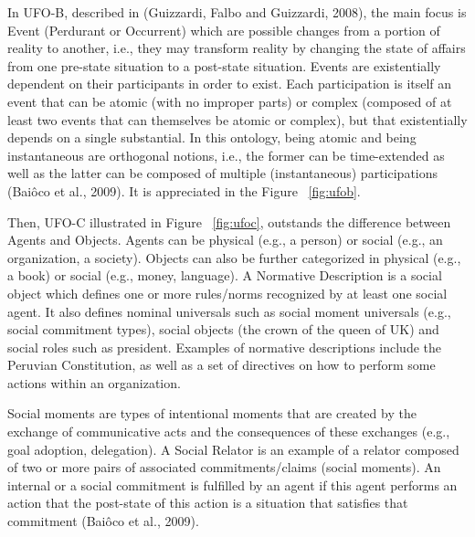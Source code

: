 In UFO-B, described in (Guizzardi, Falbo and Guizzardi, 2008), the main focus is Event (Perdurant or Occurrent) which are possible changes from a portion of reality to another, i.e., they may transform reality by changing the state of affairs from one pre-state situation to a post-state situation. Events are existentially dependent on their participants in order to exist. Each participation is itself an event that can be atomic (with no improper parts) or complex (composed of at least two events that can themselves be atomic or complex), but that existentially depends on a single substantial. In this ontology, being atomic and being instantaneous are orthogonal notions, i.e., the former can be time-extended as well as the latter can be composed of multiple (instantaneous) participations (Baiôco et al., 2009). It is appreciated in the Figure ~\ref{fig:ufob}.

Then, UFO-C illustrated in Figure ~\ref{fig:ufoc}, outstands the difference between Agents and Objects. Agents can be physical (e.g., a person) or social (e.g., an organization, a society). Objects can also be further categorized in physical (e.g., a book) or social (e.g., money, language). A Normative Description is a social object which defines one or more rules/norms recognized by at least one social agent. It also defines nominal universals such as social moment universals (e.g., social commitment types), social objects (the crown of the queen of UK) and social roles such as president. Examples of normative descriptions include the Peruvian Constitution, as well as a set of directives on how to perform some actions within an organization.

Social moments are types of intentional moments that are created by the exchange of communicative acts and the consequences of these exchanges (e.g., goal adoption, delegation). A Social Relator is an example of a relator composed of two or more pairs of associated commitments/claims (social moments). An internal or a social commitment is fulfilled by an agent if this agent performs an action that the post-state of this action is a situation that satisfies that commitment (Baiôco et al., 2009). 
